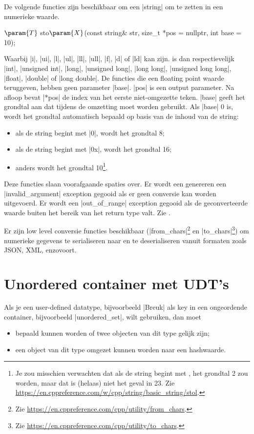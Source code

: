 \begin{cpplstShortInline}
De volgende functies zijn beschikbaar om een |string| om te zetten in een numerieke waarde.
\begin{cpplstfragment}[mathescape=true]
$\param{T}$ sto$\param{X}$(const string& str, size_t *pos = nullptr, int base = 10);
\end{cpplstfragment}
Waarbij  |i|, |ui|, |l|, |ul|, |ll|, |ull|, |f|, |d| of |ld| kan zijn.
 is dan respectievelijk |int|, |unsigned int|, |long|, |unsigned long|, |long long|, |unsigned long long|, |float|, |double| of |long double|.
De functies die een floating point waarde teruggeven, hebben geen parameter |base|.
|pos| is een output parameter. Na afloop bevat |*pos| de index van het eerste niet-omgezette teken. 
|base| geeft het grondtal aan dat tijdens de omzetting moet worden gebruikt.
Als |base| 0 is, wordt het grondtal automatisch bepaald op basis van de inhoud van de string:
\begin{itemize}
	\item als de string begint met |0|, wordt het grondtal 8;
	\item als de string begint met |0x|, wordt het grondtal 16;
	\item anders wordt het grondtal 10\footnote{%
		Je zou misschien verwachten dat als de string begint met , het grondtal 2 zou worden, maar dat is (helaas) niet het geval in \Cpp{}23.
		Zie \url{https://en.cppreference.com/w/cpp/string/basic_string/stol}.
	}.
\end{itemize}
Deze functies slaan voorafgaande spaties over.
Er wordt een genereren een |invalid_argument| exception gegooid als er geen conversie kan worden uitgevoerd.
Er wordt een |out_of_range| exception gegooid als de geconverteerde waarde buiten het bereik van het return type valt.
Zie .

Er zijn low level conversie functies beschikbaar (|from_chars|\footnote{%
	Zie \url{https://en.cppreference.com/cpp/utility/from_chars}.
} en |to_chars|\footnote{%
	Zie \url{https://en.cppreference.com/cpp/utility/to_chars}.
}) om numerieke gegevens te serialiseren naar en te deserialiseren vanuit formaten zoals JSON, XML, enzovoort.

\section{Unordered container met UDT's}
\label{sec:unorderedcontainermetUDT}
Als je een user-defined datatype, bijvoorbeeld |Breuk| als key in een ongeordende container, bijvoorbeeld |unordered_set|, wilt gebruiken, dan moet
\begin{itemize}
	\item bepaald kunnen worden of twee objecten van dit type gelijk zijn;
	\item een object van dit type omgezet kunnen worden naar een hashwaarde.
\end{itemize}


\end{cpplstShortInline}
